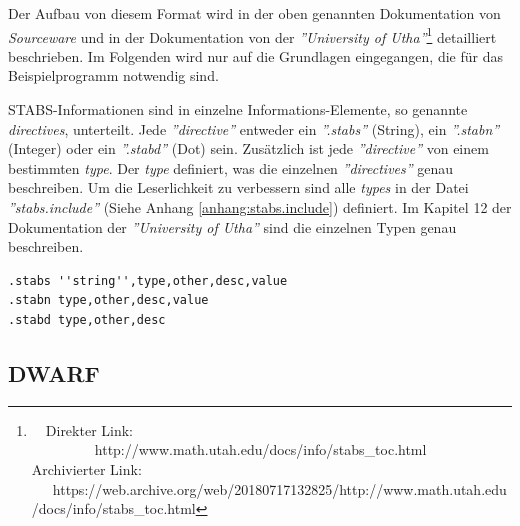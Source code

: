 Der Aufbau von diesem Format wird in der oben genannten Dokumentation von \textit{Sourceware} und in der Dokumentation von der \textit{''University of Utha''}\footnote{\ \ Direkter Link: \ \ \ \ \ \ \ \ \ http://www.math.utah.edu/docs/info/stabs\_toc.html\\ Archivierter Link: \ \ \ https://web.archive.org/web/20180717132825/http://www.math.utah.edu/docs/info/stabs\_toc.html} detailliert beschrieben.
Im Folgenden wird nur auf die Grundlagen eingegangen, die für das Beispielprogramm notwendig sind.

STABS-Informationen sind in einzelne Informations-Elemente, so genannte \textit{directives}, unterteilt.
Jede \textit{''directive''} entweder ein \textit{''.stabs''} (String), ein \textit{''.stabn''} (Integer) oder ein \textit{''.stabd''} (Dot) sein.
Zusätzlich ist jede \textit{''directive''} von einem bestimmten \textit{type}.
Der \textit{type} definiert, was die einzelnen \textit{''directives''} genau beschreiben.
Um die Leserlichkeit zu verbessern sind alle \textit{types} in der Datei \textit{''stabs.include''} (Siehe Anhang \ref{anhang:stabs.include}) definiert.
Im Kapitel 12 der Dokumentation der \textit{''University of Utha''} sind die einzelnen Typen genau beschreiben.




\lstset{language=plain}
\begin{lstlisting}
.stabs ''string'',type,other,desc,value
.stabn type,other,desc,value
.stabd type,other,desc
\end{lstlisting}





\subsection{DWARF}
